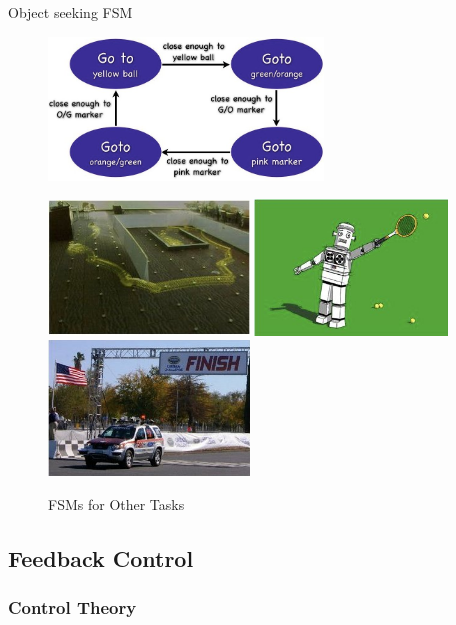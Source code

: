 Object seeking FSM\\

\begin{figure}[!h]
\centering
\includegraphics[width=0.65\textwidth]{figures/6_robot_fsm.jpg}
\end{figure}

\begin{figure}
\centerline{
\mbox{\includegraphics[width=2.10in]{figures/6_fsm_task1.jpg}}
\mbox{\includegraphics[width=2.015in]{figures/6_fsm_task2.jpg}}
\mbox{\includegraphics[width=2.10in]{figures/6_fsm_task3.jpg}}
}
\caption{FSMs for Other Tasks}
\end{figure}


\subsection{Feedback Control}

\subsubsection{Control Theory}

